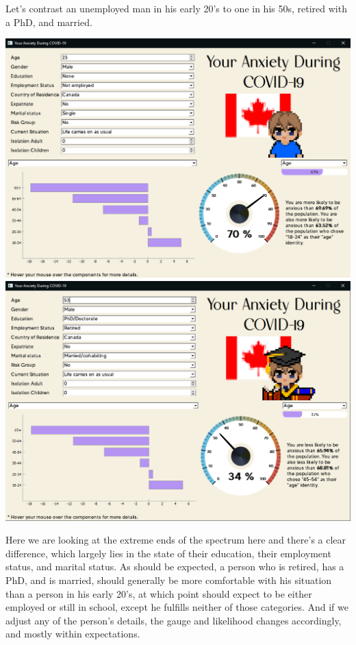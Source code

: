 \documentclass[fontsize=11pt]{article}
\begin{document}
    Let’s contrast an unemployed man in his early 20’s to one in his 50s, retired with a PhD, and married.
    \begin{center}
        \includegraphics[scale=0.30]{img/casestudy_screenshot_1}
        \includegraphics[scale=0.30]{img/casestudy_screenshot_2}
    \end{center}

    Here we are looking at the extreme ends of the spectrum here and there's a clear difference, which largely lies in the state of their education, their employment status, and marital status. As should be expected, a person who is retired, has a PhD, and is married, should generally be more comfortable with his situation than a person in his early 20’s, at which point should expect to be either employed or still in school, except he fulfills neither of those categories. And if we adjust any of the person’s details, the gauge and likelihood changes accordingly, and mostly within expectations. \\
\end{document}

